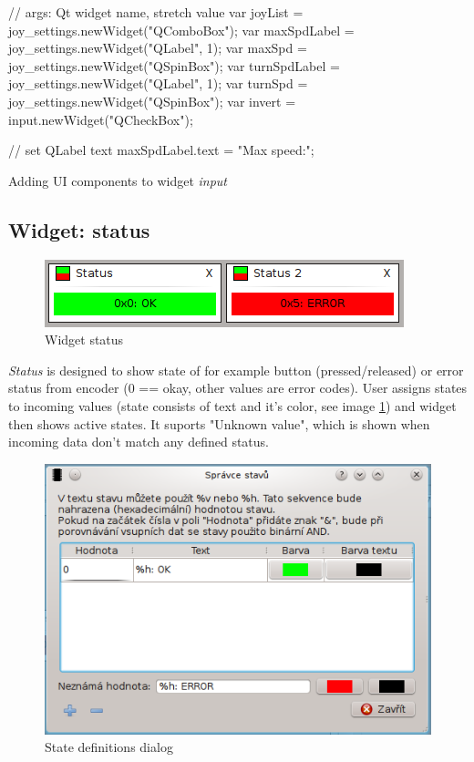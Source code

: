 \documentclass[12pt, a4paper, oneside]{article}
\newcommand{\It}{\textit}  %
\begin{document}
\begin{listing}[H]
\begin{jscode}
// args: Qt widget name, stretch value
var joyList = joy_settings.newWidget("QComboBox");
var maxSpdLabel = joy_settings.newWidget("QLabel", 1);
var maxSpd = joy_settings.newWidget("QSpinBox");
var turnSpdLabel = joy_settings.newWidget("QLabel", 1);
var turnSpd = joy_settings.newWidget("QSpinBox");
var invert = input.newWidget("QCheckBox");

// set QLabel text
maxSpdLabel.text = "Max speed:";
\end{jscode}
\caption{Adding UI components to widget \It{input}}
\label{input_script}
\end{listing}

\subsection{Widget: status}
\begin{figure}[H]
\begin{center}
\includegraphics[scale=1]{img/w_status.png}
\caption{Widget status}
\end{center}
\end{figure}
\It{Status} is designed to show state of for example button (pressed/released) or error status from encoder (0 == okay, other values are error codes). User assigns states to incoming values (state consists of text and it's color, see image \ref{status_dlg}) and widget then shows active states. It suports "Unknown value", which is shown when incoming data don't match any defined status.
\begin{figure}[H]
\begin{center}
\includegraphics[scale=1]{img/w_status_dlg.png}
\caption{State definitions dialog}
\label{status_dlg}
\end{center}
\end{figure} 
\end{document}
